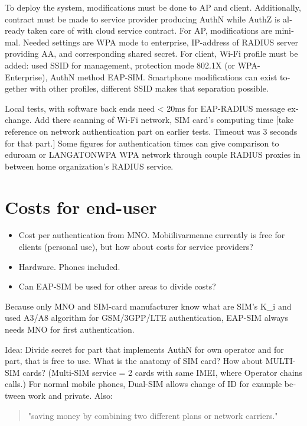 \documentclass[12pt,a4paper,english]{tutthesis}
\begin{document}
\begin{otherlanguage}{english}
To deploy the system, modifications must be done to AP and client.
Additionally, contract must be made to service
provider producing AuthN while AuthZ is already taken care of with cloud service contract.
For AP, modifications are minimal. Needed settings are
WPA mode to enterprise, IP-address of RADIUS server providing 
AA, and corresponding shared secret.
For client, Wi-Fi profile must be added: used SSID for management,
protection mode 802.1X (or WPA-Enterprise), AuthN method EAP-SIM.
Smartphone modifications can exist together with other
profiles, different SSID makes that separation possible.

Local tests, with software back ends need < 20ms for EAP-RADIUS message
exchange. 
Add there scanning of Wi-Fi network, SIM card's computing
time [take reference on network authentication part on earlier
tests. Timeout was 3 seconds for that part.]
Some figures for authentication times can give comparison to eduroam
or LANGATONWPA WPA network through couple RADIUS proxies in between home
organization's RADIUS service.

\section{Costs for end-user}
\label{sec-6-2}
\begin{itemize}
\item Cost per authentication from MNO. Mobiilivarmenne
currently is free for clients (personal use), but how about costs
for  service providers?
\item Hardware. Phones included.
\item Can EAP-SIM be used for other areas to divide costs?
\end{itemize}

Because only MNO and SIM-card manufacturer know 
what are SIM's K\_i and used A3/A8 algorithm
for GSM/3GPP/LTE authentication,
EAP-SIM always needs MNO for first authentication.


Idea: Divide secret for part that implements AuthN for own operator and
for part, that is free to use. What is the anatomy of SIM card?  How
about MULTI-SIM cards? (Multi-SIM service = 2 cards with same IMEI,
where Operator chains calls.)  For normal mobile phones, Dual-SIM
allows change of ID for example between work and private. Also:
\begin{quote}
"saving money by combining two different plans or  network carriers." 
\end{quote}


\end{otherlanguage}
\end{document}

